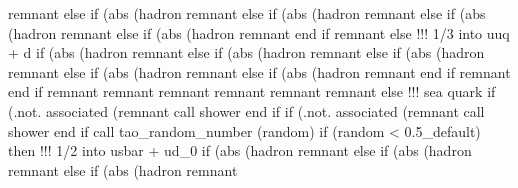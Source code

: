                       remnant%
                   else if (abs (hadron%
                      remnant%
                   else if (abs (hadron%
                      remnant%
                   else if (abs (hadron%
                      remnant%
                   else if (abs (hadron%
                      remnant%
                   end if
                   remnant%
                else
                   !!! 1/3 into uuq + d
                   if (abs (hadron%
                      remnant%
                   else if (abs (hadron%
                      remnant%
                   else if (abs (hadron%
                      remnant%
                   else if (abs (hadron%
                      remnant%
                   else if (abs (hadron%
                      remnant%
                   end if
                   remnant%
                end if
                remnant%
                remnant%
                remnant%
                remnant%
                remnant%
                remnant%
             else
                !!! sea quark
                if (.not. associated (remnant%
                   call shower%
                end if
                if (.not. associated (remnant%
                   call shower%
                end if
                call tao_random_number (random)
                if (random < 0.5_default) then
                   !!! 1/2 into usbar + ud_0
                   if (abs (hadron%
                      remnant%
                   else if (abs (hadron%
                      remnant%
                   else if (abs (hadron%
                      remnant%
